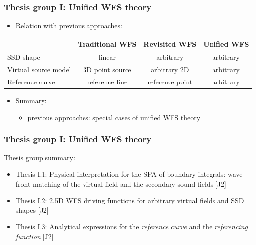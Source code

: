 \documentclass{beamer}
\renewcommand{\arraystretch}{1}
\begin{document}
\begin{frame}
\frametitle{Thesis group I: Unified WFS theory}

\begin{itemize}
\item Relation with previous approaches:
\end{itemize}
%
\begin{table}
\small
\renewcommand*{\arraystretch}{1.5}
\hspace{-5mm}
\begin{tabular}{l | c | c | c  }
 		 			 & Traditional WFS  & Revisited WFS    & Unified WFS\\
\hline \hline
SSD shape 			 &  linear 		    &   arbitrary      & arbitrary  \\ 
Virtual source model &  3D point source &  arbitrary 2D    & arbitrary  \\
Reference curve 	 &  reference line  &  reference point & arbitrary
\end{tabular}
\end{table}
%
	\vspace{5mm}
\begin{tcolorbox}
\begin{itemize}
\item Summary:
	\begin{itemize}
	\item previous approaches: special cases of unified WFS theory
	\end{itemize}	
\end{itemize}
\end{tcolorbox}	
\end{frame}

\begin{frame}
\frametitle{Thesis group I: Unified WFS theory}
Thesis group summary:
	\vspace{3mm}
	\begin{itemize}
	\item Thesis I.1: Physical interpretation for the SPA of boundary integrals: wave front matching of the virtual field and the secondary sound fields [J2]
	\vspace{3mm}
	\item Thesis I.2: 2.5D WFS driving functions for arbitrary virtual fields and SSD shapes [J2]
	\vspace{3mm}
	\item Thesis I.3: Analytical expressions for the \emph{reference curve} and the \emph{referencing function} [J2]
	\end{itemize}
\end{frame}
\end{document}
